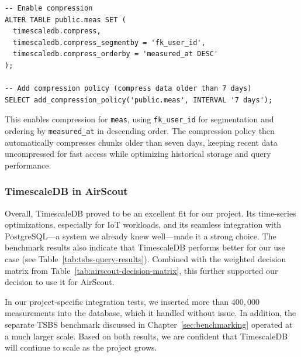 \begin{lstlisting}[language=PGTSSQL, caption={SQL command to enable compression on the "meas" table.}, label={lst:sql-enable-compression}]
-- Enable compression
ALTER TABLE public.meas SET (
  timescaledb.compress,
  timescaledb.compress_segmentby = 'fk_user_id',
  timescaledb.compress_orderby = 'measured_at DESC'
);

-- Add compression policy (compress data older than 7 days)
SELECT add_compression_policy('public.meas', INTERVAL '7 days');
\end{lstlisting}

This enables compression for \texttt{meas}, using \texttt{fk\_user\_id} for
segmentation and ordering by \texttt{measured\_at} in descending order. The
compression policy then automatically compresses chunks older than seven days,
keeping recent data uncompressed for fast access while optimizing historical
storage and query performance.

\subsubsection{TimescaleDB in AirScout}

Overall, TimescaleDB proved to be an excellent fit for our project. Its
time-series optimizations, especially for IoT workloads, and its seamless
integration with PostgreSQL---a system we already knew well---made it a strong
choice. The benchmark results also indicate that TimescaleDB performs better
for our use case (see Table~\ref{tab:tsbs-query-results}). Combined with the
weighted decision matrix from Table~\ref{tab:airscout-decision-matrix}, this
further supported our decision to use it for AirScout.

In our project-specific integration tests, we inserted more than $400{,}000$
measurements into the database, which it handled without issue. In addition,
the separate TSBS benchmark discussed in Chapter~\ref{sec:benchmarking}
operated at a much larger scale. Based on both results, we are confident that
TimescaleDB will continue to scale as the project grows.